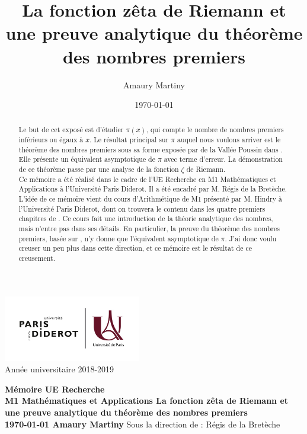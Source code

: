 \documentclass[french]{report}
\title{La fonction zêta de Riemann et une preuve analytique du théorème des nombres premiers}
\author{Amaury Martiny}
\date{\today}
\begin{document}
\begin{titlepage}
  \centering
  \includegraphics[width=6cm]{paris_diderot_logo.jpg}\\
  Année universitaire 2018-2019

  \vfill
  {\bfseries
    Mémoire UE Recherche\\
    M1 Mathématiques et Applications
    \vskip1cm
    \Large La fonction zêta de Riemann et une preuve analytique du théorème des nombres premiers\\
    \vskip1cm
    \normalsize \today
    \vskip1cm
    Amaury Martiny
  }    
  \vfill
  \vfill
  Sous la direction de :\hskip1cm Régis de la Bretèche
\end{titlepage}

\begin{abstract}
  Le but de cet exposé est d'étudier $\pi(x)$, qui compte le nombre de nombres premiers inférieurs ou égaux à $x$. Le résultat principal sur $\pi$ auquel nous voulons arriver est le théorème des nombres premiers sous sa forme exposée par de la Vallée Poussin dans \cite{valleepoussin}. Elle présente un équivalent asymptotique de $\pi$ avec terme d'erreur. La démonstration de ce théorème passe par une analyse de la fonction $\zeta$ de Riemann.
  \\

  Ce mémoire a été réalisé dans le cadre de l'UE Recherche en M1 Mathématiques et Applications à l'Université Paris Diderot. Il a été encadré par M. Régis de la Bretèche.
  \\

  L'idée de ce mémoire vient du cours d'Arithmétique de M1 présenté par M. Hindry à l'Université Paris Diderot, dont on trouvera le contenu dans les quatre premiers chapitres de \cite{hindry}. Ce cours fait une introduction de la théorie analytique des nombres, mais n'entre pas dans ses détails. En particulier, la preuve du théorème des nombres premiers, basée sur \cite{donzagier}, n'y donne que l'équivalent asymptotique de $\pi$. J'ai donc voulu creuser un peu plus dans cette direction, et ce mémoire est le résultat de ce creusement.
\end{abstract}

\tableofcontents{}
\end{document}
